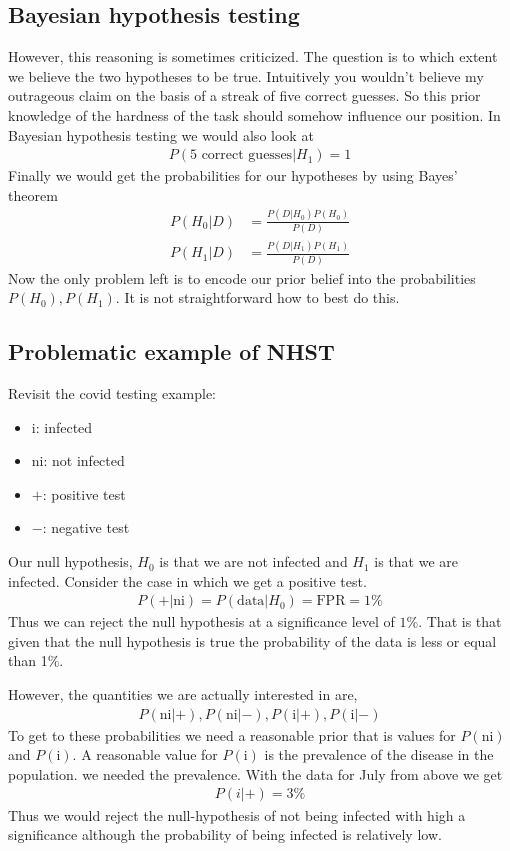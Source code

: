\subsection{Bayesian hypothesis testing}
However, this reasoning is sometimes criticized.
The question is to which extent we believe the two hypotheses to be true.
Intuitively you wouldn't believe my outrageous claim on the basis of a streak of five correct guesses.
So this prior knowledge of the hardness of the task should somehow influence our position.
In Bayesian hypothesis testing we would also look at 
\begin{align}
  P(\text{5 correct guesses}| H_{1}) = 1
\end{align}
Finally we would get the probabilities for our hypotheses by using Bayes' theorem
\begin{align}
  P(H_0|D) &= \frac{P(D|H_0)P(H_0)}{P(D)} \\
  P(H_1|D) &= \frac{P(D|H_1)P(H_1)}{P(D)} 
\end{align}
Now the only problem left is to encode our prior belief into the probabilities $P(H_0), P(H_1)$.
It is not straightforward how to best do this. 

\subsection{Problematic example of NHST}

Revisit the covid testing example:
\begin{itemize}
  \item i: infected
  \item ni: not infected
  \item $+$: positive test
  \item $-$: negative test
\end{itemize}

Our null hypothesis, $H_{0}$ is that we are not infected and $H_1$ is that we are infected.
Consider the case in which we get a positive test.
\begin{align}
  P(+|\text{ni}) = P(\text{data}| H_{0}) = \text{FPR} = 1\% 
\end{align}
Thus we can reject the null hypothesis at a significance level of $1\%$. 
That is that given that the null hypothesis is true the probability of the data is less or equal than 1\%.

However, the quantities we are actually interested in are,
\begin{align}
  P(\text{ni}|+), P(\text{ni}|-), P(\text{i}|+), P(\text{i}|-) 
\end{align}
To get to these probabilities we need a reasonable prior that is values for $P(\text{ni})$ and $P(\text{i})$.
A reasonable value for $P(\text{i})$ is the prevalence of the disease in the population.
we needed the prevalence.
With the data for July from above we get 
\begin{align}
  P(i|+) = 3\%
\end{align}
Thus we would reject the null-hypothesis of not being infected with high a significance although the probability of being infected is relatively low.
